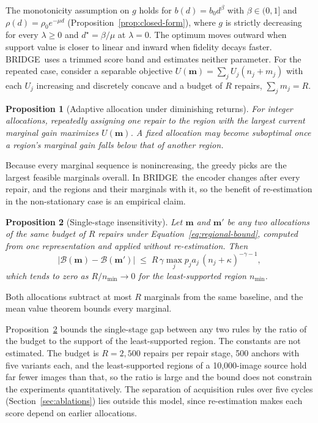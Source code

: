 \documentclass{article}
\newcommand{\method}{BRIDGE}
\newtheorem{proposition}{Proposition}
\begin{document}
The monotonicity assumption on $g$ holds for $b(d)=b_0d^{\beta}$ with $\beta\in(0,1]$ and $\rho(d)=\rho_0e^{-\mu d}$ (Proposition~\ref{prop:closed-form}), where $g$ is strictly decreasing for every $\lambda\geq0$ and $d^{\star}=\beta/\mu$ at $\lambda=0$. The optimum moves outward when support value is closer to linear and inward when fidelity decays faster. \method\ uses a trimmed score band and estimates neither parameter. For the repeated case, consider a separable objective $U(\mathbf m)=\sum_jU_j(n_j+m_j)$ with each $U_j$ increasing and discretely concave and a budget of $R$ repairs, $\sum_jm_j=R$.

\begin{proposition}[Adaptive allocation under diminishing returns]
\label{prop:adaptive}
For integer allocations, repeatedly assigning one repair to the region with the largest current marginal gain maximizes $U(\mathbf m)$. A fixed allocation may become suboptimal once a region's marginal gain falls below that of another region.
\end{proposition}
Because every marginal sequence is nonincreasing, the greedy picks are the largest feasible marginals overall. In \method\ the encoder changes after every repair, and the regions and their marginals with it, so the benefit of re-estimation in the non-stationary case is an empirical claim.

\begin{proposition}[Single-stage insensitivity]
\label{prop:one-stage}
Let $\mathbf m$ and $\mathbf m'$ be any two allocations of the same budget of $R$ repairs under Equation~\ref{eq:regional-bound}, computed from one representation and applied without re-estimation. Then
\begin{equation}
\bigl|\mathcal B(\mathbf m)-\mathcal B(\mathbf m')\bigr|\;\leq\;R\,\gamma\max_j p_ja_j\,(n_j+\kappa)^{-\gamma-1},
\end{equation}
which tends to zero as $R/n_{\min}\to0$ for the least-supported region $n_{\min}$.
\end{proposition}
Both allocations subtract at most $R$ marginals from the same baseline, and the mean value theorem bounds every marginal.

Proposition~\ref{prop:one-stage} bounds the single-stage gap between any two rules by the ratio of the budget to the support of the least-supported region. The constants are not estimated. The budget is $R=2{,}500$ repairs per repair stage, 500 anchors with five variants each, and the least-supported regions of a 10{,}000-image source hold far fewer images than that, so the ratio is large and the bound does not constrain the experiments quantitatively. The separation of acquisition rules over five cycles (Section~\ref{sec:ablations}) lies outside this model, since re-estimation makes each score depend on earlier allocations.
\end{document}
